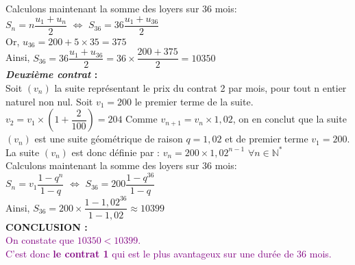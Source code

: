 \documentclass[a4paper,12pt,twoside,french]{extarticle}
\newcommand{\N}{\ensuremath{\mathbb{N}}\xspace}
\begin{document}
Calculons maintenant la somme des loyers sur 36 mois:\\

$S_n=n\dfrac{u_1+u_n}{2}$ $\Leftrightarrow$ $S_{36}=36\dfrac{u_1+u_{36}}{2}$\\

Or, $u_{36}=200+5 \times 35 =375$\\

Ainsi, $S_{36}=36\dfrac{u_1+u_{36}}{2}=36 \times \dfrac{200+375}{2}= 10 350$\\

\textbf{\textit{Deuxième contrat} :}\\
Soit $(v_n)$ la suite représentant le prix du contrat 2 par mois, pour tout n entier naturel non nul. Soit $v_1=200$ le premier terme de la suite.\\

$v_2=v_1 \times (1+\dfrac{2}{100}) = 204$ \hspace*{0.25cm} Comme $v_{n+1}=v_n \times 1,02$, on en conclut que la suite $(v_n)$ est une suite géométrique de raison $q=1,02$ et de premier terme $v_1=200$.\\

La suite $(v_n)$ est donc définie par : $v_n=200 \times 1,02^{n-1}$ $\forall n \in \N^*$\\

Calculons maintenant la somme des loyers sur 36 mois:\\

$S_n=v_1\dfrac{1-q^{n}}{1-q}$ $\Leftrightarrow$ $S_{36}=200\dfrac{1-q^{36}}{1-q}$\\


Ainsi, $S_{36}=200 \times \dfrac{1-1,02^{36}}{1-1,02} \approx 10 399$\\


\textbf{CONCLUSION :} \\
\textcolor{purple}{On constate que $10350<10399$.}\\
\textcolor{purple}{ C'est donc \textbf{le contrat 1} qui est le plus avantageux sur une durée de 36 mois.}
\color{black}
\end{document}
